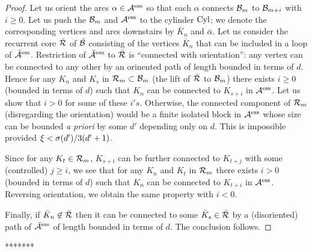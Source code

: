 {\begin{proof}
Let us orient the arcs $\alpha\in {\mathcal A}^{\mathrm{ess}}$ so that each $\alpha$ connects ${\mathcal B}_m$ to ${\mathcal B}_{m+i}$ with $i\geq 0$. 
  Let us push the ${\mathcal B}_m$ and ${\mathcal A}^{\mathrm{ess}}$ to the cylinder ${\mathrm{Cyl}}$; 
we denote the corresponding vertices and arcs downstairs by $\bar K_n$ and  $\bar \alpha$. 
Let us consider the recurrent core $\bar {{\mathcal R}}$ of $\bar {{\mathcal B}}$ consisting of the vertices $\bar K_n$  that can be included in a loop
of $\bar{{\mathcal A}}^{\mathrm{ess}}$. Restriction of $\bar {{\mathcal A}}^{\mathrm{ess}}$ to $\bar{{\mathcal R}}$ is ``connected with orientation'': any vertex can be connected to any other
by an orinented path of length bounded in terms of  $d$.
Hence for any $K_n$ and $K_s$ in ${\mathcal R}_m\subset {\mathcal B}_m$ (the lift of
$\bar {{\mathcal R}}$ to ${\mathcal B}_m$)
there exists $i\geq 0$ (bounded in terms of $d$) such that 
 $K_n$ can be connected to $K_{s+i}$ in ${\mathcal A}^{\mathrm{ess}}$. 
Let us show that $i>0$ for some of these $i's$. Otherwise, the  connected component of ${\mathcal R}_m$ (disregarding the orientation)
would be a finite isolated block in ${\mathcal A}^{\mathrm{ess}}$ whose size can be bounded {\it a priori } by some  $d'$ depending only on $d$.
This is impossible provided $\xi< {\sigma}(d')/ 3(d'+1)$.  

Since for any $K_t\in {\mathcal R}_m$,  $K_{s+i}$ can be further connected  to $K_{t+j}$ with some (controlled) $j\geq i$, we see that 
 for any $K_n$ and $K_t$ in ${\mathcal R}_m$ there exists $i > 0$ (bounded in terms of $d$) such that 
 $K_n$ can be connected to $K_{t+i}$ in ${\mathcal A}^{\mathrm{ess}}$.  Reversing orientation, we obtain the same property with $i<0$. 

Finally, if $\bar K_n\not \in \bar {{\mathcal R}}$ then it can be connected to some $\bar K_s\in \bar {{\mathcal R}}$ 
by a (disoriented) path of $\bar {{\mathcal A}}^{\mathrm{ess}}$ of length bounded in terms of $d$. The conclusion follows. 
\end{proof}

******* } 


